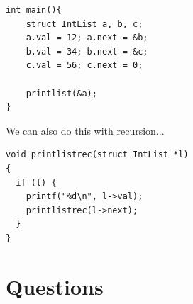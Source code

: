 \documentclass{beamer}
\begin{document}
\begin{frame}[fragile]
\begin{block}{}
\begin{lstlisting}
int main(){
    struct IntList a, b, c;
    a.val = 12; a.next = &b;
    b.val = 34; b.next = &c;
    c.val = 56; c.next = 0;
    
    printlist(&a);
}
\end{lstlisting}
\end{block}
\end{frame}

\begin{frame}[fragile]
We can also do this with recursion...
\begin{block}{}
\begin{lstlisting}
void printlistrec(struct IntList *l)
{
  if (l) {
    printf("%d\n", l->val);
    printlistrec(l->next);
  } 
}
\end{lstlisting}
\end{block}
\end{frame}

\section{Questions}
\end{document}
